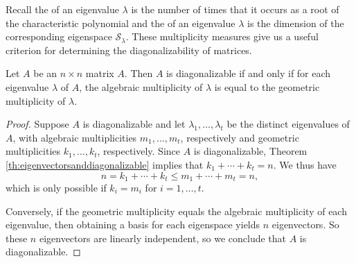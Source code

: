 \documentclass{ximera}
\begin{document}
  Recall the  of an eigenvalue $\lambda$ is the number of times that it occurs as a root of the characteristic polynomial and the  of an eigenvalue $\lambda$ is the dimension of the corresponding eigenspace $\mathcal{S}_\lambda$. These multiplicity measures give us a useful criterion for determining the diagonalizability of matrices. 
   
  \begin{theorem}\label{th:diagonalizability}
  Let $A$ be an $n \times n$ matrix $A$. Then $A$ is diagonalizable if and only if for each eigenvalue $\lambda$ of $A$, the algebraic multiplicity of $\lambda$ is equal to the geometric multiplicity of $\lambda$.
  \end{theorem}
   
  \begin{proof}
  Suppose $A$ is diagonalizable and let $\lambda_1, \ldots, \lambda_t$ be the distinct eigenvalues of $A$, with algebraic multiplicities $m_1, \ldots, m_t$, respectively and geometric multiplicities $k_1, \ldots, k_t$, respectively.  Since $A$ is diagonalizable, Theorem \ref{th:eigenvectorsanddiagonalizable} implies that $ k_1+\cdots+k_t=n$.  We thus have
  $$n = k_1+\cdots+k_t \le m_1+\cdots+m_t = n,$$
  which is only possible if $k_i=m_i$ for $i=1,\ldots,t$.
   
  Conversely, if the geometric multiplicity equals the algebraic multiplicity of each eigenvalue, then obtaining a basis for each eigenspace yields $n$ eigenvectors. So these $n$ eigenvectors are linearly independent, so we conclude that $A$ is diagonalizable.
  \end{proof}
\end{document}
